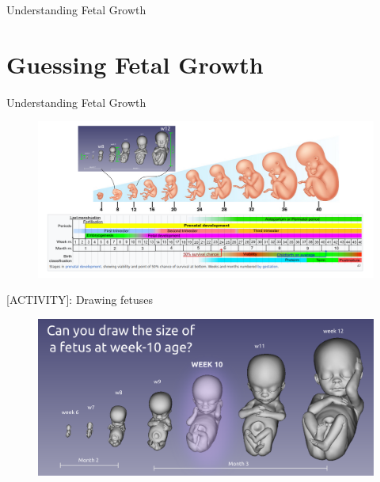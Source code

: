

{
\begin{frame}{}

\BigSizeFont
Understanding Fetal Growth
\end{frame}
}




\section{Guessing Fetal Growth}


{
\begin{frame}{Understanding Fetal Growth}
      \begin{figure}
        \centering
        \includegraphics[width=1.0\textwidth]{./../figures/fetal-growth/versions/drawing-v02.png}
      \end{figure}
\end{frame}
}





{
\begin{frame}{[\faUsers ACTIVITY]: Drawing fetuses}
      \begin{figure}
        \centering
        \includegraphics[width=1.0\textwidth]{./../figures/fetal-growth-guess/versions/drawing-v03}
      \end{figure}
\end{frame}
}



